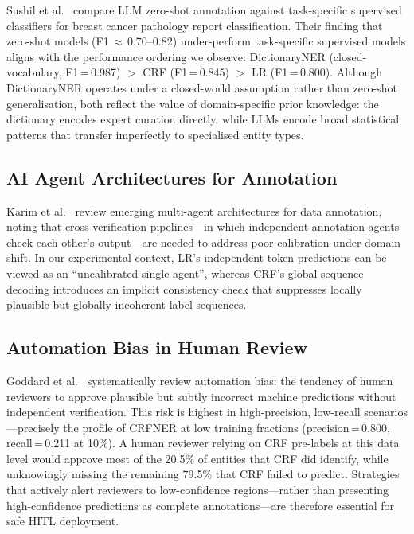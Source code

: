 \documentclass[sigconf,nonacm]{acmart}
\begin{document}
Sushil et al.~\cite{sushil2024} compare LLM zero-shot annotation against task-specific supervised classifiers for breast cancer pathology report classification. Their finding that zero-shot models (F1\,$\approx$\,0.70--0.82) under-perform task-specific supervised models aligns with the performance ordering we observe: DictionaryNER (closed-vocabulary, F1\,=\,0.987) $>$ CRF (F1\,=\,0.845) $>$ LR (F1\,=\,0.800). Although DictionaryNER operates under a closed-world assumption rather than zero-shot generalisation, both reflect the value of domain-specific prior knowledge: the dictionary encodes expert curation directly, while LLMs encode broad statistical patterns that transfer imperfectly to specialised entity types.

\subsection{AI Agent Architectures for Annotation}

Karim et al.~\cite{karim2025} review emerging multi-agent architectures for data annotation, noting that cross-verification pipelines---in which independent annotation agents check each other's output---are needed to address poor calibration under domain shift. In our experimental context, LR's independent token predictions can be viewed as an ``uncalibrated single agent'', whereas CRF's global sequence decoding introduces an implicit consistency check that suppresses locally plausible but globally incoherent label sequences.

\subsection{Automation Bias in Human Review}

Goddard et al.~\cite{goddard2012} systematically review automation bias: the tendency of human reviewers to approve plausible but subtly incorrect machine predictions without independent verification. This risk is highest in high-precision, low-recall scenarios---precisely the profile of CRFNER at low training fractions (precision\,=\,0.800, recall\,=\,0.211 at 10\%). A human reviewer relying on CRF pre-labels at this data level would approve most of the 20.5\% of entities that CRF did identify, while unknowingly missing the remaining 79.5\% that CRF failed to predict. Strategies that actively alert reviewers to low-confidence regions---rather than presenting high-confidence predictions as complete annotations---are therefore essential for safe HITL deployment.
\end{document}
